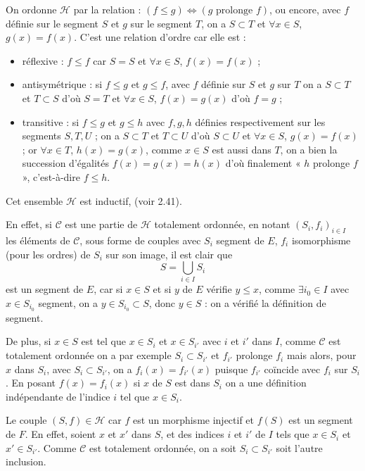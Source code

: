 On ordonne $\mathcal H$ par la relation : $(f\le g)\Leftrightarrow(g\text{ prolonge }f)$, ou encore, avec $f$ définie sur le segment $S$ et $g$ sur le segment $T$, on a $S\subset T$ et $\forall x\in S$, $g(x)=f(x)$. C'est une relation d'ordre car elle est :
\begin{itemize}[leftmargin=2em]
\item réflexive : $f\le f$ car $S=S$ et $\forall x\in S$, $f(x)=f(x)$ ;
\item antisymétrique : si $f\le g$ et $g\le f$, avec $f$ définie sur $S$ et $g$ sur $T$ on a $S\subset T$ et $T\subset S$ d'où $S=T$ et $\forall x\in S$, $f(x)=g(x)$ d'où $f=g$ ;
\item transitive : si $f\le g$ et $g\le h$ avec $f,g,h$ définies respectivement sur les segments $S,T,U$ ; on a $S\subset T$ et $T\subset U$ d'où $S\subset U$ et $\forall x\in S$, $g(x)=f(x)$ ; or $\forall x\in T$, $h(x)=g(x)$, comme $x\in S$ est aussi dans $T$, on a bien la succession d'égalités $f(x)=g(x)=h(x)$ d'où finalement « $h$ prolonge $f$ », c'est-à-dire $f\le h$.
\end{itemize}

Cet ensemble $\mathcal H$ est inductif, (voir 2.41).

En effet, si $\mathcal C$ est une partie de $\mathcal H$ totalement ordonnée, en notant $(S_i,f_i)_{i\in I}$ les éléments de $\mathcal C$, sous forme de couples avec $S_i$ segment de $E$, $f_i$ isomorphisme (pour les ordres) de $S_i$ sur son image, il est clair que
\[
S=\bigcup_{i\in I}S_i
\]
est un segment de $E$, car si $x\in S$ et si $y$ de $E$ vérifie $y\le x$, comme $\exists i_0\in I$ avec $x\in S_{i_0}$ segment, on a $y\in S_{i_0}\subset S$, donc $y\in S$ : on a vérifié la définition de segment.

De plus, si $x\in S$ est tel que $x\in S_i$ et $x\in S_{i'}$ avec $i$ et $i'$ dans $I$, comme $\mathcal C$ est totalement ordonnée on a par exemple $S_i\subset S_{i'}$ et $f_{i'}$ prolonge $f_i$ mais alors, pour $x$ dans $S_i$, avec $S_i\subset S_{i'}$, on a $f_i(x)=f_{i'}(x)$ puisque $f_{i'}$ coïncide avec $f_i$ sur $S_i$. En posant $f(x)=f_i(x)$ si $x$ de $S$ est dans $S_i$ on a une définition indépendante de l'indice $i$ tel que $x\in S_i$.

Le couple $(S,f)\in\mathcal H$ car $f$ est un morphisme injectif et $f(S)$ est un segment de $F$. En effet, soient $x$ et $x'$ dans $S$, et des indices $i$ et $i'$ de $I$ tels que $x\in S_i$ et $x'\in S_{i'}$. Comme $\mathcal C$ est totalement ordonnée, on a soit $S_i\subset S_{i'}$ soit l'autre inclusion.

